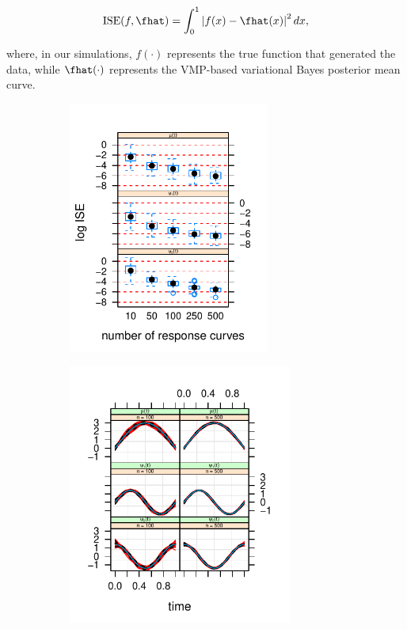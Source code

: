 \documentclass[ba]{imsart}
\numberwithin{equation}{section}
\theoremstyle{plain}
\begin{document}
\begin{equation}
	\text{ISE} (f, \fhat) = \int_0^1 \left| f (x) - \fhat(x) \right|^2 dx,
\label{ise}
\end{equation}

\noindent where, in our simulations, $f (\cdot)$ represents the true function that generated the data, while $\fhat (\cdot)$
represents the VMP-based variational Bayes posterior mean curve.

\begin{figure}
	\centering
	\begin{subfigure}[t]{0.49\textwidth}
		\centering
		\includegraphics[width=2.6in]{images/box_plot_sims.pdf}
	\caption{}
	\label{subfig:bf_accs}
	\end{subfigure}
	\begin{subfigure}[t]{0.49\textwidth}
		\centering
		\includegraphics[width=2.9in]{images/panel_plot.pdf}
	\caption{}
	\label{subfig:bf_sims}
	\end{subfigure}

\end{figure}
\end{document}
